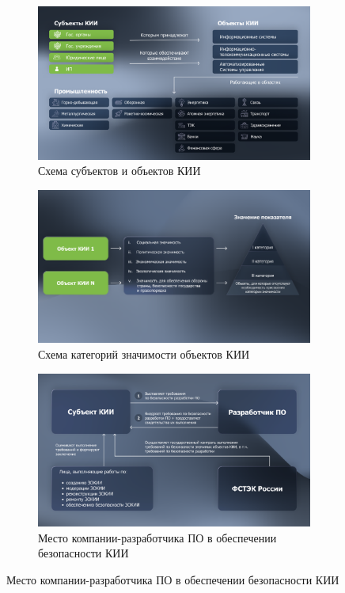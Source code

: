 \documentclass[a4paper, 14pt]{report}
\begin{document}
\begin{figure}[H]
    \centering
    \begin{subfigure}[c]{0.49\textwidth}
        \includegraphics[width=\textwidth]{images/shema-subjects-objects.png}
        \caption{Схема субъектов и объектов КИИ}
    \end{subfigure}
    \begin{subfigure}[c]{0.49\textwidth}
        \includegraphics[width=\textwidth]{images/shema-importance-objects.png}
        \caption{Схема категорий значимости объектов КИИ}
    \end{subfigure}
    \begin{subfigure}[c]{0.49\textwidth}
        \includegraphics[width=\textwidth]{images/developer.png}
        \caption{Место компании-разработчика ПО в обеспечении безопасности КИИ}
    \end{subfigure}
\end{figure}

\printbibliography[title=Список литературы]
\end{document}
